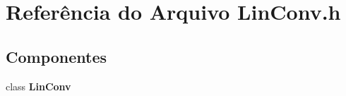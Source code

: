 \section{Referência do Arquivo Lin\+Conv.\+h}
\label{_lin_conv_8h}
\subsection*{Componentes}
\begin{DoxyCompactItemize}
\item 
class {\bf Lin\+Conv}
\end{DoxyCompactItemize}
